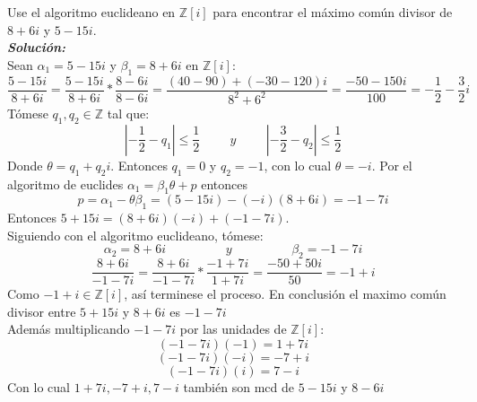 Use el algoritmo euclideano en $\mathbb{Z}[i]$ para encontrar el máximo común divisor de $8 + 6i$ y $5 - 15i$.\\
    \textbf{\textit{Soluci\'on:}}\\
    Sean $\alpha_1=5-15i$ y $\beta_1=8+6i$ en $\mathbb{Z}[i]$:\\
    $$\dfrac{5-15i}{8+6i}=\dfrac{5-15i}{8+6i}*\dfrac{8-6i}{8-6i}=\dfrac{(40-90)+(-30-120)i}{8^2+6^2}=\dfrac{-50-150i}{100}=-\dfrac{1}{2}-\dfrac{3}{2}i$$
    T\'omese $q_1,q_2\in \mathbb{Z}$ tal que: 
    $$\left|-\dfrac{1}{2}-q_1\right|\leq\dfrac{1}{2}\hspace{1cm}y\hspace{1cm}\left|-\dfrac{3}{2}-q_2\right|\leq\dfrac{1}{2}$$
    Donde $\theta=q_1+q_2i$. Entonces $q_1=0$ y $q_2=-1$, con lo cual $\theta=-i$. Por el algoritmo de euclides $\alpha_1=\beta_1\theta+p$ entonces
    $$p=\alpha_1-\theta\beta_{1}=(5-15i)-(-i)(8+6i)=-1-7i$$
    Entonces $5+15i=(8+6i)(-i)+(-1-7i)$. \\
    Siguiendo con el algoritmo euclideano, t\'omese: 
    $$\alpha_2=8+6i\hspace{2cm}y\hspace{2cm}\beta_2=-1-7i$$
    $$\dfrac{8+6i}{-1-7i}=\dfrac{8+6i}{-1-7i}*\dfrac{-1+7i}{1+7i}=\dfrac{-50+50i}{50}=-1+i$$
    Como $-1+i\in\mathbb{Z}[i]$, as\'i terminese el proceso. En conclusi\'on el maximo com\'un divisor entre $5+15i$ y $8+6i$ es $-1-7i$ \\
    Adem\'as multiplicando $-1-7i$ por las unidades de $\mathbb{Z}[i]$:
    $$(-1-7i)(-1)=1+7i$$
    $$(-1-7i)(-i)=-7+i$$
    $$(-1-7i)(i)=7-i$$
    Con lo cual $1+7i,-7+i,7-i$ también son mcd de $5-15i$ y $8-6i$